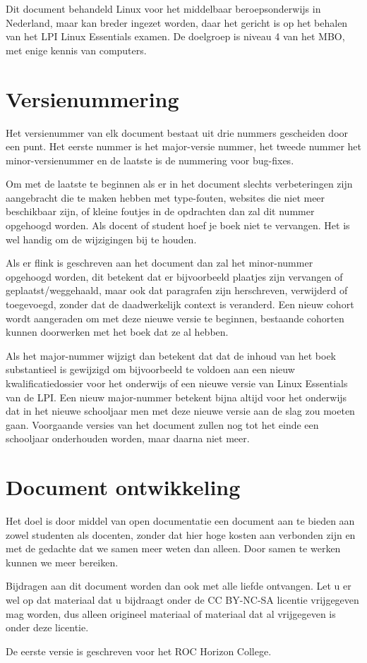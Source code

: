 Dit document behandeld Linux voor het middelbaar beroepsonderwijs in Nederland, maar kan breder ingezet worden, daar het gericht is op het behalen van het LPI Linux Essentials examen. De doelgroep is niveau 4 van het MBO, met enige kennis van computers.

\section*{Versienummering}
Het versienummer van elk document bestaat uit drie nummers gescheiden door een punt. Het eerste nummer is het major-versie nummer, het tweede nummer het minor-versienummer en de laatste is de nummering voor bug-fixes.\par
Om met de laatste te beginnen als er in het document slechts verbeteringen zijn aangebracht die te maken hebben met type-fouten, websites die niet meer beschikbaar zijn, of kleine foutjes in de opdrachten dan zal dit nummer opgehoogd worden. Als docent of student hoef je boek niet te vervangen. Het is wel handig om de wijzigingen bij te houden.\par
Als er flink is geschreven aan het document dan zal het minor-nummer opgehoogd worden, dit betekent dat er bijvoorbeeld plaatjes zijn vervangen of geplaatst/weggehaald, maar ook dat paragrafen zijn herschreven, verwijderd of toegevoegd, zonder dat de daadwerkelijk context is veranderd. Een nieuw cohort wordt aangeraden om met deze nieuwe versie te beginnen, bestaande cohorten kunnen doorwerken met het boek dat ze al hebben.\par
Als het major-nummer wijzigt dan betekent dat dat de inhoud van het boek substantieel is gewijzigd om bijvoorbeeld te voldoen aan een nieuw kwalificatiedossier voor het onderwijs of een nieuwe versie van Linux Essentials van de LPI. Een nieuw major-nummer betekent bijna altijd voor het onderwijs dat in het nieuwe schooljaar men met deze nieuwe versie aan de slag zou moeten gaan. Voorgaande versies van het document zullen nog tot het einde een schooljaar onderhouden worden, maar daarna niet meer.

\section*{Document ontwikkeling}
Het doel is door middel van open documentatie een document aan te bieden aan zowel studenten als docenten, zonder dat hier hoge kosten aan verbonden zijn en met de gedachte dat we samen meer weten dan alleen. Door samen te werken kunnen we meer bereiken.\par
Bijdragen aan dit document worden dan ook met alle liefde ontvangen. Let u er wel op dat materiaal dat u bijdraagt onder de CC BY-NC-SA licentie vrijgegeven mag worden, dus alleen origineel materiaal of materiaal dat al vrijgegeven is onder deze licentie.\par
De eerste versie is geschreven voor het ROC Horizon College.
